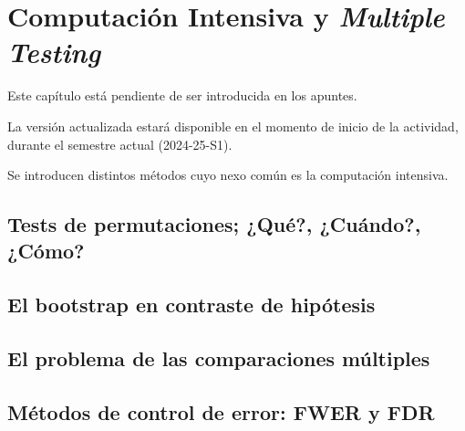 \documentclass[
]{article}
\begin{document}
\section{\texorpdfstring{Computación Intensiva y \emph{Multiple Testing}}{Computación Intensiva y Multiple Testing}}\label{computaciuxf3n-intensiva-y-multiple-testing}

Este capítulo está pendiente de ser introducida en los apuntes.

La versión actualizada estará disponible en el momento de inicio de la actividad, durante el semestre actual (2024-25-S1).

Se introducen distintos métodos cuyo nexo común es la computación intensiva.

\subsection{Tests de permutaciones; ¿Qué?, ¿Cuándo?, ¿Cómo?}\label{tests-de-permutaciones-quuxe9-cuuxe1ndo-cuxf3mo}

\subsection{El bootstrap en contraste de hipótesis}\label{el-bootstrap-en-contraste-de-hipuxf3tesis}

\subsection{El problema de las comparaciones múltiples}\label{el-problema-de-las-comparaciones-muxfaltiples}

\subsection{Métodos de control de error: FWER y FDR}\label{muxe9todos-de-control-de-error-fwer-y-fdr}
\end{document}
